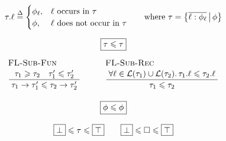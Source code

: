 $$ 
\begin{array}{c}
\flproj{\tau}{\ell} \defeq \begin{cases}
    \phi_\ell, & \ell \text{ occurs in } \tau \\
    \phi, & \ell \text{ does not occur in } \tau
\end{cases} \qquad \text{where } \tau = \flext{ \overline{\ell : \phi_\ell}}{\phi}
\\[1.5em]
\boxed{\tau \sub \tau}
\\[0.5em]
\irule{FL-Sub-Fun}{\tau_1 \super \tau_2 \quad \tau_1' \sub \tau_2'}{\tau_1 \to \tau_1' \sub \tau_2 \to \tau_2'}
\qquad
\irule{FL-Sub-Rec}{\forall \ell \in \mathcal L(\tau_1) \cup \mathcal L(\tau_2) \ldotp \flproj{\tau_1}{\ell} \sub \flproj{\tau_2}{\ell}}{\tau_1 \sub \tau_2}
\\[2.5em]
\boxed{\phi \sub \phi}
\\[1em]
\flfbot \sub \tau \sub \flftop \qquad \flfbot \sub \flabsent \sub \flftop
\end{array} 
$$